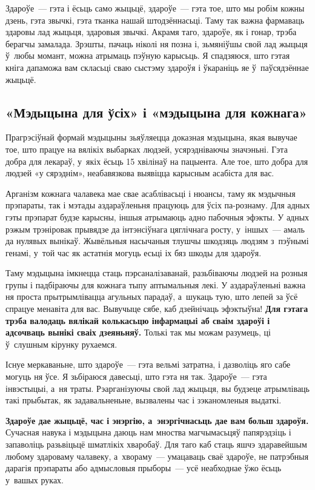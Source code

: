 Здароўе~--- гэта і ёсьць само жыцьцё, здароўе~--- гэта тое, што мы робім кожны дзень, гэта звычкі, гэта тканка нашай штодзённасьці. Таму так важна фармаваць здаровы лад жыцьця, здаровыя звычкі. Акрамя таго, здароўе, як і гонар, трэба берагчы замалада. Зрэшты, пачаць ніколі ня позна і, зьмяніўшы свой лад жыцьця ў~любы момант, можна атрымаць пэўную карысьць. Я спадзяюся, што гэтая кніга дапаможа вам скласьці сваю сыстэму здароўя і ўкараніць яе ў~паўсядзённае жыцьцё.

\subsection*{«Мэдыцына для ўсіх» і «мэдыцына для кожнага»}

Прагрэсіўнай формай мэдыцыны зьяўляецца доказная мэдыцына, якая вывучае тое, што працуе на вялікіх выбарках людзей, усярэдніваючы значэньні. Гэта добра для лекараў, у~якіх ёсьць 15 хвілінаў на пацыента. Але тое, што добра для людзей «у сярэднім», неабавязкова выявіцца карысным асабіста для вас.

Арганізм кожнага чалавека мае свае асаблівасьці і нюансы, таму як мэдычныя прэпараты, так і мэтады аздараўленьня працуюць для ўсіх па-рознаму. Для адных гэты прэпарат будзе карысны, іншыя атрымаюць адно пабочныя эфэкты. У адных рэжым трэніровак прывядзе да інтэнсіўнага цяглічнага росту, у~іншых~--- амаль да нулявых вынікаў. Жывёльныя насычаныя тлушчы шкодзяць людзям з~пэўнымі генамі, у~той час як астатнія могуць есьці іх бяз шкоды для здароўя.

Таму мэдыцына імкнецца стаць пэрсаналізаванай, разьбіваючы людзей на розныя групы і падбіраючы для кожнага тыпу аптымальныя лекі. У аздараўленьні важна ня проста прытрымлівацца агульных парадаў, а~шукаць тую, што лепей за ўсё спрацуе менавіта для вас. Вывучыце сябе, каб дзейнічаць эфэктыўна! \textbf{Для гэтага трэба валодаць вялікай колькасьцю інфармацыі аб сваім здароўі і адсочваць вынікі сваіх дзеяньняў.} Толькі так мы можам разумець, ці ў~слушным кірунку рухаемся.

Існуе меркаваньне, што здароўе~--- гэта вельмі затратна, і дазволіць яго сабе могуць ня ўсе. Я зьбіраюся давесьці, што гэта ня так. Здароўе~--- гэта інвэстыцыі, а~ня траты. Рэарганізуючы свой лад жыцьця, вы будзеце атрымліваць такі прыбытак, як задавальненьне, вызвалены час і зэканомленыя выдаткі.

\textbf{Здароўе дае жыцьцё, час і энэргію, а~энэргічнасьць дае вам больш здароўя.} Сучасная навука і мэдыцына даюць нам мноства магчымасьцяў папярэдзіць і запаволіць разьвіцьцё шматлікіх хваробаў. Для таго каб стаць яшчэ здаравейшым любому здароваму чалавеку, а~хвораму~--- умацаваць сваё здароўе, не патрэбныя дарагія прэпараты або адмысловыя прыборы~--- усё неабходнае ўжо ёсьць у~вашых руках. 

